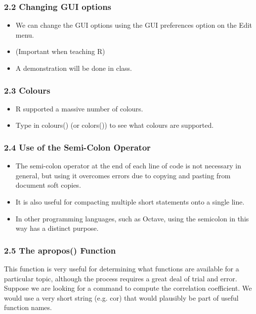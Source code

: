  
 
 \frametitle{2.2 Changing GUI options}
 \begin{itemize}
 \item We can change the GUI options using the GUI preferences option on the Edit menu.
 \item  (Important
 when teaching R) 
 \item A demonstration will be done in class.
 \end{itemize}
 
 
 
 \frametitle{2.3 Colours}
 \begin{itemize}
 \item R supported a massive number of colours.
 \item Type in colours() (or colors()) to see what colours
 are supported.
 \end{itemize}
 
 
 \frametitle{2.4 Use of the Semi-Colon Operator}
 \begin{itemize}
 \item The semi-colon operator at the end of each line of code is not necessary in general, but using it
 overcomes errors due to copying and pasting from document soft copies. 
 \item It is also useful for compacting multiple short statements onto a single line.
 \item In other programming
 languages, such as Octave, using the semicolon in this way has a distinct purpose.
 \end{itemize}
 
 
 \frametitle{2.5 The apropos() Function}
 This function is very useful for determining what functions are available for a particular topic,
 although the process requires a great deal of trial and error. Suppose we are looking for a
 command to compute the correlation coefficient. We would use a very short string (e.g. cor)
 that would plausibly be part of useful function names.
 
 
 
